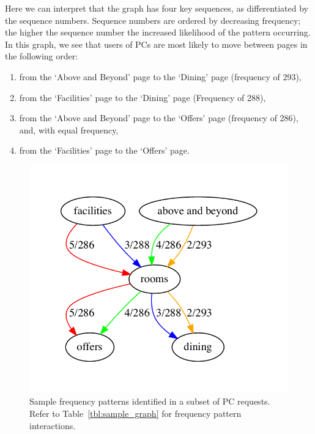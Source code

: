 \documentclass[12pt,titlepage]{article}
\begin{document}
Here we can interpret that the graph has four key sequences, as differentiated by the sequence numbers. Sequence numbers are ordered by decreasing frequency; the higher the sequence number the increased likelihood of the pattern occurring. In this graph, we see that users of PCs are most likely to move between pages in the following order:

\begin{enumerate}
  \item from the `Above and Beyond' page to the `Dining' page (frequency of 293),
  \item from the `Facilities' page to the `Dining' page (Frequency of 288),
  \item from the `Above and Beyond' page to the `Offers' page (frequency of 286), and, with equal frequency,
  \item from the `Facilities' page to the `Offers' page.
\end{enumerate} 

\newpage


\begin{figure}[b!]
  \centering
  \includegraphics{figs/digraphs/sample_graph}
  \caption[Sample frequency patterns identified in a subset of PC requests]{Sample frequency patterns identified in a subset of PC requests. Refer to Table~\ref{tbl:sample_graph} for frequency pattern interactions.}
  \label{fig:sample_graph}
\end{figure}
\end{document}

